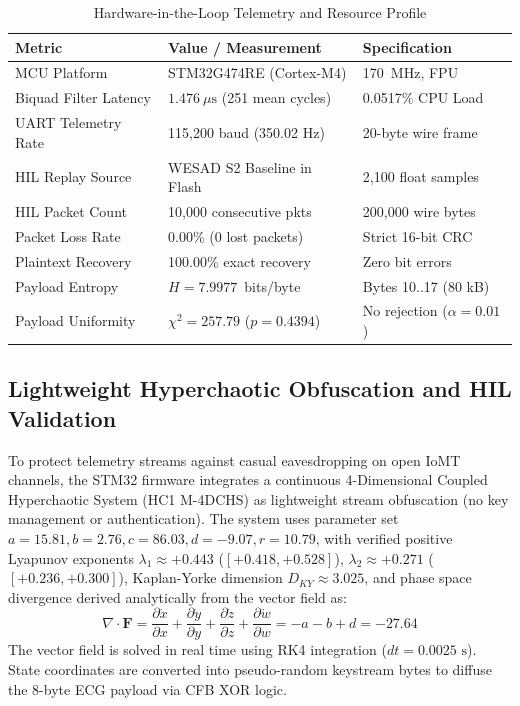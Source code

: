 \documentclass[conference]{IEEEtran}
\begin{document}
\begin{table}[t]
\centering
\caption{Hardware-in-the-Loop Telemetry and Resource Profile}
\label{tab:hw_profile}
\begin{tabular}{lll}
\toprule
\textbf{Metric} & \textbf{Value / Measurement} & \textbf{Specification} \\
\midrule
MCU Platform         & STM32G474RE (Cortex-M4) & 170~MHz, FPU \\
Biquad Filter Latency& $1.476~\mu\text{s}$ (251 mean cycles) & 0.0517\% CPU Load \\
UART Telemetry Rate  & 115,200 baud (350.02 Hz)& 20-byte wire frame \\
HIL Replay Source    & WESAD S2 Baseline in Flash & 2,100 float samples \\
HIL Packet Count     & 10,000 consecutive pkts & 200,000 wire bytes \\
Packet Loss Rate     & 0.00\% (0 lost packets) & Strict 16-bit CRC \\
Plaintext Recovery   & 100.00\% exact recovery & Zero bit errors \\
Payload Entropy      & $H = 7.9977$~bits/byte  & Bytes 10..17 (80 kB) \\
Payload Uniformity   & $\chi^2 = 257.79$ ($p=0.4394$) & No rejection ($\alpha=0.01$) \\
\bottomrule
\end{tabular}
\end{table}

\subsection{Lightweight Hyperchaotic Obfuscation and HIL Validation}
To protect telemetry streams against casual eavesdropping on open IoMT channels, the STM32 firmware integrates a continuous 4-Dimensional Coupled Hyperchaotic System (HC1 M-4DCHS) as lightweight stream obfuscation (no key management or authentication). The system uses parameter set $a=15.81, b=2.76, c=86.03, d=-9.07, r=10.79$, with verified positive Lyapunov exponents $\lambda_1 \approx +0.443$ ($[+0.418, +0.528]$), $\lambda_2 \approx +0.271$ ($[+0.236, +0.300]$), Kaplan-Yorke dimension $D_{KY} \approx 3.025$, and phase space divergence derived analytically from the vector field as:
\begin{equation}
    \nabla \cdot \mathbf{F} = \frac{\partial \dot{x}}{\partial x} + \frac{\partial \dot{y}}{\partial y} + \frac{\partial \dot{z}}{\partial z} + \frac{\partial \dot{w}}{\partial w} = -a - b + d = -27.64
\end{equation}
The vector field is solved in real time using RK4 integration ($dt = 0.0025\text{ s}$). State coordinates are converted into pseudo-random keystream bytes to diffuse the 8-byte ECG payload via CFB XOR logic.
\end{document}

